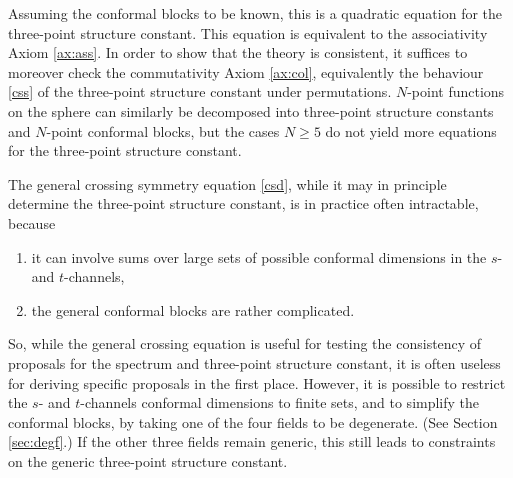 \documentclass[12pt, a4paper, notitlepage, twoside]{report}
\numberwithin{equation}{section}
\theoremstyle{break}
\begin{document}
Assuming the conformal blocks to be known, this is a quadratic equation for the three-point structure constant.
This equation is equivalent to the associativity Axiom \ref{ax:ass}. In order to show that the theory is consistent, it suffices to moreover check the commutativity Axiom \ref{ax:col}, equivalently the behaviour \eqref{css} of the three-point structure constant under permutations. 
$N$-point functions on the sphere can similarly be decomposed into three-point structure constants and $N$-point conformal blocks, but the cases $N\geq 5$ do not yield more equations for the three-point structure constant. 

The general crossing symmetry equation \eqref{csd}, while it may in principle determine the three-point structure constant, is in practice often intractable, because
\begin{enumerate}
 \item it can involve sums over large sets of possible conformal dimensions in the $s$- and $t$-channels, 
 \item the general conformal blocks are rather complicated. 
\end{enumerate}
So, while the general crossing equation is useful for testing the consistency of proposals for the spectrum and three-point structure constant, it is often useless for deriving specific proposals in the first place. However, it is possible to restrict the $s$- and $t$-channels conformal dimensions to finite sets, and to simplify the conformal blocks, by taking one of the four fields to be degenerate. (See Section \ref{sec:degf}.) If the other three fields remain generic, this still leads to constraints on the generic three-point structure constant. 
\end{document}
